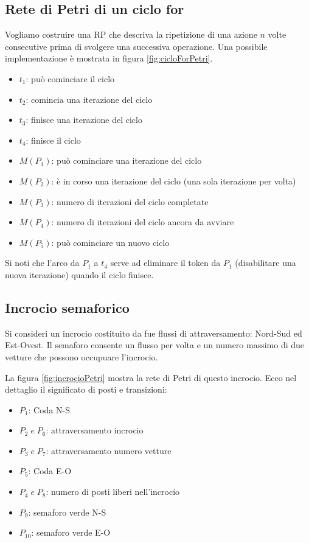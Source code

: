 \documentclass[a4paper]{report}
\begin{document}
\subsection{Rete di Petri di un ciclo for}
Vogliamo costruire una RP che descriva la ripetizione di una azione
$n$ volte consecutive prima di svolgere una successiva operazione. Una
possibile implementazione \`e mostrata in figura
\ref{fig:cicloForPetri}.

\begin{itemize}
\item $t_1$: pu\`o cominciare il ciclo
\item $t_2$: comincia una iterazione del ciclo
\item $t_3$: finisce una iterazione del ciclo
\item $t_4$: finisce il ciclo
\item $M(P_1)$: pu\`o cominciare una iterazione del ciclo
\item $M(P_2)$: \`e in corso una iterazione del ciclo (una sola
  iterazione per volta)
\item $M(P_3)$: numero di iterazioni del ciclo completate
\item $M(P_4)$: numero di iterazioni del ciclo ancora da avviare
\item $M(P_5)$: pu\`o cominciare un nuovo ciclo
\end{itemize}

Si noti che l'arco da $P_1$ a $t_4$ serve ad eliminare il token da
$P_1$ (disabilitare una nuova iterazione) quando il ciclo finisce.

\subsection{Incrocio semaforico}
Si consideri un incrocio costituito da fue flussi di attraversamento:
Nord-Sud ed Est-Ovest. Il semaforo consente un flusso per volta e un
numero massimo di due vetture che possono occupuare l'incrocio.

La figura \ref{fig:incrocioPetri} mostra la rete di Petri di questo
incrocio. Ecco nel dettaglio il significato di posti e transizioni:
\begin{itemize}
\item $P_1$: Coda N-S
\item $P_2 \; e \; P_6$: attraversamento incrocio
\item $P_3 \; e \; P_7$: attraversamento numero vetture
\item $P_5$: Coda E-O
\item $P_4 \; e \; P_8$: numero di posti liberi nell'incrocio
\item $P_9$: semaforo verde N-S
\item $P_{10}$: semaforo verde E-O
\end{itemize}
\end{document}

